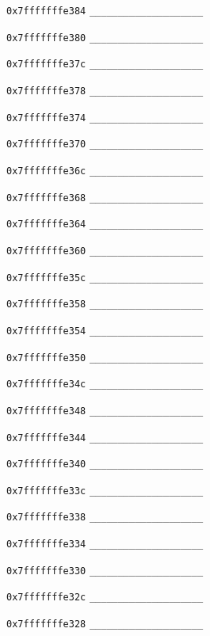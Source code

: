 \begin{problems}
\begin{compactdesc}
            \item[\texttt{0x7fffffffe384}] \verb|____________________|
            \item[\texttt{0x7fffffffe380}] \verb|____________________|
            \item[\texttt{0x7fffffffe37c}] \verb|____________________|
            \item[\texttt{0x7fffffffe378}] \verb|____________________|
            \item[\texttt{0x7fffffffe374}] \verb|____________________|
            \item[\texttt{0x7fffffffe370}] \verb|____________________|
            \item[\texttt{0x7fffffffe36c}] \verb|____________________|
            \item[\texttt{0x7fffffffe368}] \verb|____________________|
            \item[\texttt{0x7fffffffe364}] \verb|____________________|
            \item[\texttt{0x7fffffffe360}] \verb|____________________|
            \item[\texttt{0x7fffffffe35c}] \verb|____________________|
            \item[\texttt{0x7fffffffe358}] \verb|____________________|
            \item[\texttt{0x7fffffffe354}] \verb|____________________|
            \item[\texttt{0x7fffffffe350}] \verb|____________________|
            \item[\texttt{0x7fffffffe34c}] \verb|____________________|
            \item[\texttt{0x7fffffffe348}] \verb|____________________|
            \item[\texttt{0x7fffffffe344}] \verb|____________________|
            \item[\texttt{0x7fffffffe340}] \verb|____________________|
            \item[\texttt{0x7fffffffe33c}] \verb|____________________|
            \item[\texttt{0x7fffffffe338}] \verb|____________________|
            \item[\texttt{0x7fffffffe334}] \verb|____________________|
            \item[\texttt{0x7fffffffe330}] \verb|____________________|
            \item[\texttt{0x7fffffffe32c}] \verb|____________________|
            \item[\texttt{0x7fffffffe328}] \verb|____________________|

\end{compactdesc}
\end{problems}
